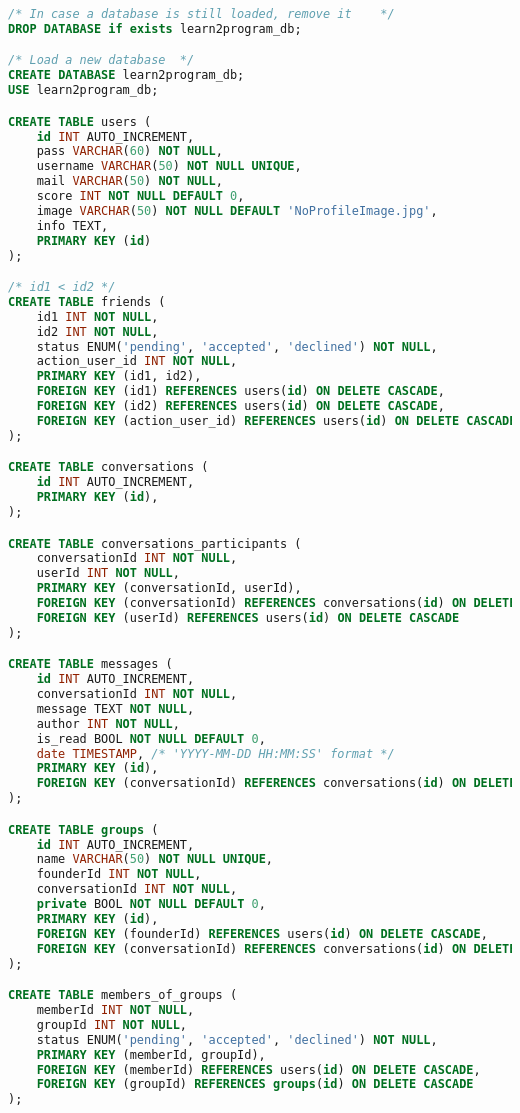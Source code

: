 \begin{lstlisting}[language=sql]
/* In case a database is still loaded, remove it    */
DROP DATABASE if exists learn2program_db;

/* Load a new database  */
CREATE DATABASE learn2program_db;
USE learn2program_db;

CREATE TABLE users (
    id INT AUTO_INCREMENT,
    pass VARCHAR(60) NOT NULL,
    username VARCHAR(50) NOT NULL UNIQUE,
    mail VARCHAR(50) NOT NULL,
    score INT NOT NULL DEFAULT 0,
    image VARCHAR(50) NOT NULL DEFAULT 'NoProfileImage.jpg',
    info TEXT,
    PRIMARY KEY (id)
);

/* id1 < id2 */
CREATE TABLE friends (
    id1 INT NOT NULL,
    id2 INT NOT NULL,
    status ENUM('pending', 'accepted', 'declined') NOT NULL,
    action_user_id INT NOT NULL,
    PRIMARY KEY (id1, id2),
    FOREIGN KEY (id1) REFERENCES users(id) ON DELETE CASCADE,
    FOREIGN KEY (id2) REFERENCES users(id) ON DELETE CASCADE,
    FOREIGN KEY (action_user_id) REFERENCES users(id) ON DELETE CASCADE
);

CREATE TABLE conversations (
    id INT AUTO_INCREMENT,
    PRIMARY KEY (id),
);

CREATE TABLE conversations_participants (
    conversationId INT NOT NULL,
    userId INT NOT NULL,
    PRIMARY KEY (conversationId, userId),
    FOREIGN KEY (conversationId) REFERENCES conversations(id) ON DELETE CASCADE,
    FOREIGN KEY (userId) REFERENCES users(id) ON DELETE CASCADE
);

CREATE TABLE messages (
    id INT AUTO_INCREMENT,
    conversationId INT NOT NULL,
    message TEXT NOT NULL,
    author INT NOT NULL,
    is_read BOOL NOT NULL DEFAULT 0,
    date TIMESTAMP, /* 'YYYY-MM-DD HH:MM:SS' format */
    PRIMARY KEY (id),
    FOREIGN KEY (conversationId) REFERENCES conversations(id) ON DELETE CASCADE
);

CREATE TABLE groups (
    id INT AUTO_INCREMENT,
    name VARCHAR(50) NOT NULL UNIQUE,
    founderId INT NOT NULL,
    conversationId INT NOT NULL,
    private BOOL NOT NULL DEFAULT 0,
    PRIMARY KEY (id),
    FOREIGN KEY (founderId) REFERENCES users(id) ON DELETE CASCADE,
    FOREIGN KEY (conversationId) REFERENCES conversations(id) ON DELETE CASCADE
);

CREATE TABLE members_of_groups (
    memberId INT NOT NULL,
    groupId INT NOT NULL,
    status ENUM('pending', 'accepted', 'declined') NOT NULL,
    PRIMARY KEY (memberId, groupId),
    FOREIGN KEY (memberId) REFERENCES users(id) ON DELETE CASCADE,
    FOREIGN KEY (groupId) REFERENCES groups(id) ON DELETE CASCADE
);


\end{lstlisting}
